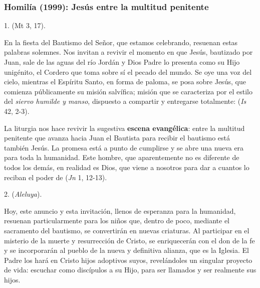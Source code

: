 			\subsubsection{Homilía (1999): Jesús entre la multitud penitente}
			
				
				\begin{body}
					1.  (Mt 3, 17).
					
					En la fiesta del Bautismo del Señor, que estamos celebrando, resuenan estas palabras solemnes. Nos invitan a revivir el momento en que Jesús, bautizado por Juan, sale de las aguas del río Jordán y Dios Padre lo presenta como su Hijo unigénito, el Cordero que toma sobre sí el pecado del mundo. Se oye una voz del cielo, mientras el Espíritu Santo, en forma de paloma, se posa sobre Jesús, que comienza públicamente su misión salvífica; misión que se caracteriza por el estilo del \emph{siervo humilde y manso}, dispuesto a compartir y entregarse totalmente:  (\emph{Is} 42, 2-3).
					
					La liturgia nos hace revivir la sugestiva \textbf{escena evangélica}: entre la multitud penitente que avanza hacia Juan el Bautista para recibir el bautismo está también Jesús. La promesa está a punto de cumplirse y se abre una nueva era para toda la humanidad. Este hombre, que aparentemente no es diferente de todos los demás, en realidad es Dios, que viene a nosotros para dar a cuantos lo reciban el poder de  (\emph{Jn} 1, 12-13).
					
					2.  (\emph{Aleluya}).
					
					Hoy, este anuncio y esta invitación, llenos de esperanza para la humanidad, resuenan particularmente para los niños que, dentro de poco, mediante el sacramento del bautismo, se convertirán en nuevas criaturas. Al participar en el misterio de la muerte y resurrección de Cristo, se enriquecerán con el don de la fe y se incorporarán al pueblo de la nueva y definitiva alianza, que es la Iglesia. El Padre los hará en Cristo hijos adoptivos suyos, revelándoles un singular proyecto de vida: escuchar como discípulos a su Hijo, para ser llamados y ser realmente sus hijos.
					

\end{body}
